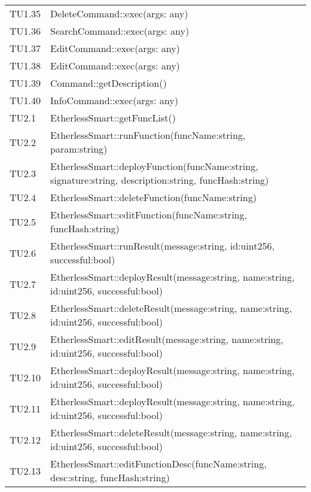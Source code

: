\begin{longtable}{
		>{\centering}p{}
		>{\centering\arraybackslash}p{}}
	TU1.35 & DeleteCommand::exec(args: any) \\

	TU1.36 & SearchCommand::exec(args: any) \\
	
	TU1.37 & EditCommand::exec(args: any) \\

	TU1.38 & EditCommand::exec(args: any) \\
	
	TU1.39 & Command::getDescription() \\
	
	TU1.40 & InfoCommand::exec(args: any) \\
	
	TU2.1  &  EtherlessSmart::getFuncList()  \tabularnewline
	
	TU2.2  &  EtherlessSmart::runFunction(funcName:string, param:string)  \tabularnewline
	
	TU2.3  &  EtherlessSmart::deployFunction(funcName:string, signature:string, description:string, funcHash:string)  \tabularnewline
	
	TU2.4  &  EtherlessSmart::deleteFunction(funcName:string)  \tabularnewline
	
	TU2.5  &  EtherlessSmart::editFunction(funcName:string, funcHash:string)  \tabularnewline
	
	TU2.6  &  EtherlessSmart::runResult(message:string, id:uint256, successful:bool)  \tabularnewline
	
	TU2.7  &  EtherlessSmart::deployResult(message:string, name:string, id:uint256, successful:bool)  \tabularnewline
	
	TU2.8  &  EtherlessSmart::deleteResult(message:string, name:string, id:uint256, successful:bool)  \tabularnewline
	
	TU2.9  &  EtherlessSmart::editResult(message:string, name:string, id:uint256, successful:bool)  \tabularnewline
	
	TU2.10 &  EtherlessSmart::deployResult(message:string, name:string, id:uint256, successful:bool)  \tabularnewline
	
	TU2.11 &  EtherlessSmart::deployResult(message:string, name:string, id:uint256, successful:bool)  \tabularnewline
	
	TU2.12 &  EtherlessSmart::deleteResult(message:string, name:string, id:uint256, successful:bool)  \tabularnewline
	
	TU2.13 &  EtherlessSmart::editFunctionDesc(funcName:string, desc:string, funcHash:string)  \tabularnewline
	

\end{longtable}
